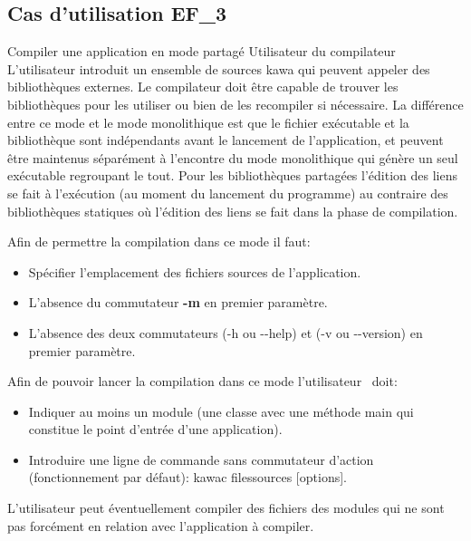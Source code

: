 \subsection{Cas d'utilisation EF\_3}
\fiche
{Compiler une application en mode partagé}                    %
{Utilisateur du compilateur}                               %
{                                                %
  L’utilisateur introduit un ensemble de sources kawa
 qui peuvent appeler des bibliothèques externes. Le compilateur doit être capable de trouver les bibliothèques pour les utiliser ou bien  de les recompiler si nécessaire. La différence entre ce mode et le mode monolithique est que le fichier exécutable et la bibliothèque sont indépendants avant le lancement de l’application, et peuvent être maintenus séparément à l'encontre du mode monolithique qui génère un seul exécutable regroupant le tout. Pour les bibliothèques partagées l'édition des liens se fait à l’exécution (au moment du lancement du programme) au contraire des bibliothèques statiques où l'édition des liens se fait dans la phase de compilation. 
}
{
	Afin de permettre la compilation dans ce mode il faut:
	\begin{itemize}
  	\item Spécifier l’emplacement des fichiers sources de l'application.
  	\item L'absence du commutateur  \textbf {-m}  en premier paramètre.
  	\item L'absence des deux commutateurs (-h ou -\hspace{0.1mm}-help) et (-v ou -\hspace{0.1mm}-version) en premier paramètre.
  	\end {itemize}

	
}                                                %
{

Afin de pouvoir lancer la compilation dans ce mode l'utilisateur  doit: 
\begin{itemize}
  	\item Indiquer au moins un module (une classe avec une méthode main qui constitue le point d'entrée d'une application).
  	\item Introduire une ligne de commande sans commutateur d'action (fonctionnement par défaut): kawac filessources [options].
 \end {itemize}
 L'utilisateur peut éventuellement compiler des fichiers des modules qui ne sont pas forcément en relation avec l'application à compiler.
}  %
